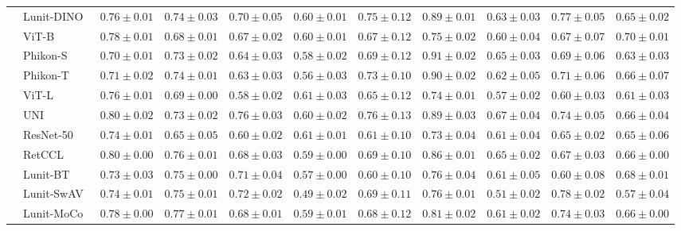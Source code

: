 \begin{tabular}{ll|cccc|c|cccc}
 & Lunit-DINO~\cite{kang2023benchmarking} & $0.76 \pm 0.01$ & $0.74 \pm 0.03$ & $0.70 \pm 0.05$ & $0.60 \pm 0.01$ & $0.75 \pm 0.12$ & $0.89 \pm 0.01$ & $0.63 \pm 0.03$ & $0.77 \pm 0.05$ & $0.65 \pm 0.02$ \\
 & ViT-B~\cite{kolesnikov2021image} & $0.78 \pm 0.01$ & $0.68 \pm 0.01$ & $0.67 \pm 0.02$ & $0.60 \pm 0.01$ & $0.67 \pm 0.12$ & $0.75 \pm 0.02$ & $0.60 \pm 0.04$ & $0.67 \pm 0.07$ & $\mathbf{0.70 \pm 0.01}$ \\
 & Phikon-S~\cite{filiot2023scaling} & $0.70 \pm 0.01$ & $0.73 \pm 0.02$ & $0.64 \pm 0.03$ & $0.58 \pm 0.02$ & $0.69 \pm 0.12$ & $\mathbf{0.91 \pm 0.02}$ & $0.65 \pm 0.03$ & $0.69 \pm 0.06$ & $0.63 \pm 0.03$ \\
 & Phikon-T~\cite{filiot2023scaling} & $0.71 \pm 0.02$ & $0.74 \pm 0.01$ & $0.63 \pm 0.03$ & $0.56 \pm 0.03$ & $0.73 \pm 0.10$ & $0.90 \pm 0.02$ & $0.62 \pm 0.05$ & $0.71 \pm 0.06$ & $0.66 \pm 0.07$ \\
 & ViT-L~\cite{kolesnikov2021image} & $0.76 \pm 0.01$ & $0.69 \pm 0.00$ & $0.58 \pm 0.02$ & $0.61 \pm 0.03$ & $0.65 \pm 0.12$ & $0.74 \pm 0.01$ & $0.57 \pm 0.02$ & $0.60 \pm 0.03$ & $0.61 \pm 0.03$ \\
 & UNI~\cite{chen2024uni} & $0.80 \pm 0.02$ & $0.73 \pm 0.02$ & $\mathbf{0.76 \pm 0.03}$ & $0.60 \pm 0.02$ & $\mathbf{0.76 \pm 0.13}$ & $0.89 \pm 0.03$ & $\mathbf{0.67 \pm 0.04}$ & $0.74 \pm 0.05$ & $0.66 \pm 0.04$ \\
 & ResNet-50~\cite{he2015deep} & $0.74 \pm 0.01$ & $0.65 \pm 0.05$ & $0.60 \pm 0.02$ & $0.61 \pm 0.01$ & $0.61 \pm 0.10$ & $0.73 \pm 0.04$ & $0.61 \pm 0.04$ & $0.65 \pm 0.02$ & $0.65 \pm 0.06$ \\
 & RetCCL~\cite{wang2023retccl} & $0.80 \pm 0.00$ & $0.76 \pm 0.01$ & $0.68 \pm 0.03$ & $0.59 \pm 0.00$ & $0.69 \pm 0.10$ & $0.86 \pm 0.01$ & $0.65 \pm 0.02$ & $0.67 \pm 0.03$ & $0.66 \pm 0.00$ \\
 & Lunit-BT~\cite{kang2023benchmarking} & $0.73 \pm 0.03$ & $0.75 \pm 0.00$ & $0.71 \pm 0.04$ & $0.57 \pm 0.00$ & $0.60 \pm 0.10$ & $0.76 \pm 0.04$ & $0.61 \pm 0.05$ & $0.60 \pm 0.08$ & $0.68 \pm 0.01$ \\
 & Lunit-SwAV~\cite{kang2023benchmarking} & $0.74 \pm 0.01$ & $0.75 \pm 0.01$ & $0.72 \pm 0.02$ & $0.49 \pm 0.02$ & $0.69 \pm 0.11$ & $0.76 \pm 0.01$ & $0.51 \pm 0.02$ & $\mathbf{0.78 \pm 0.02}$ & $0.57 \pm 0.04$ \\
 & Lunit-MoCo~\cite{kang2023benchmarking} & $0.78 \pm 0.00$ & $\mathbf{0.77 \pm 0.01}$ & $0.68 \pm 0.01$ & $0.59 \pm 0.01$ & $0.68 \pm 0.12$ & $0.81 \pm 0.02$ & $0.61 \pm 0.02$ & $0.74 \pm 0.03$ & $0.66 \pm 0.00$ \\
\cline{1-11}
\bottomrule
\end{tabular}
